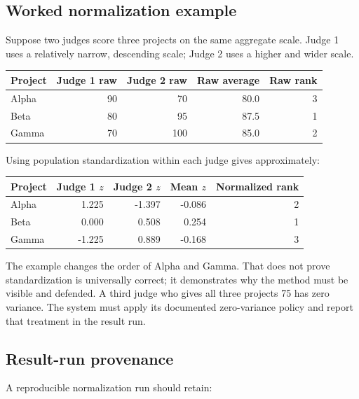 \subsection{Worked normalization example}

Suppose two judges score three projects on the same aggregate scale. Judge 1 uses a relatively narrow, descending scale; Judge 2 uses a higher and wider scale.

\begin{center}
\begin{tabular}{@{}lrrrr@{}}
\toprule
\textbf{Project} & \textbf{Judge 1 raw} & \textbf{Judge 2 raw} & \textbf{Raw average} & \textbf{Raw rank}\\
\midrule
Alpha & 90 & 70 & 80.0 & 3\\
Beta  & 80 & 95 & 87.5 & 1\\
Gamma & 70 & 100 & 85.0 & 2\\
\bottomrule
\end{tabular}
\end{center}

Using population standardization within each judge gives approximately:

\begin{center}
\begin{tabular}{@{}lrrrr@{}}
\toprule
\textbf{Project} & \textbf{Judge 1 $z$} & \textbf{Judge 2 $z$} & \textbf{Mean $z$} & \textbf{Normalized rank}\\
\midrule
Alpha & 1.225 & -1.397 & -0.086 & 2\\
Beta  & 0.000 &  0.508 &  0.254 & 1\\
Gamma & -1.225 & 0.889 & -0.168 & 3\\
\bottomrule
\end{tabular}
\end{center}

The example changes the order of Alpha and Gamma. That does not prove standardization is universally correct; it demonstrates why the method must be visible and defended. A third judge who gives all three projects 75 has zero variance. The system must apply its documented zero-variance policy and report that treatment in the result run.

\subsection{Result-run provenance}

A reproducible normalization run should retain:

